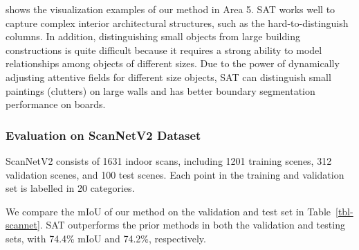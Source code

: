 \documentclass[10pt,twocolumn,letterpaper]{article}
\begin{document}
 shows the visualization examples of our method in Area 5. SAT works well to capture complex interior architectural structures, such as the hard-to-distinguish columns. In addition, distinguishing small objects from large building constructions is quite difficult because it requires a strong ability to model relationships among objects of different sizes. Due to the power of dynamically adjusting attentive fields for different size objects, SAT can distinguish small paintings (clutters) on large walls and has better boundary segmentation performance on boards. 









\subsubsection{Evaluation on ScanNetV2 Dataset}
\quad ScanNetV2\cite{datasetscannet} consists of 1631 indoor scans, including 1201 training scenes, 312 validation scenes, and 100 test scenes. Each point in the training and validation set is labelled in 20 categories. 



We compare the mIoU of our method on the validation and test set in Table~\ref{tbl-scannet}. SAT outperforms the prior methods in both the validation and testing sets, with 74.4\% mIoU and 74.2\%, respectively. 
\end{document}
